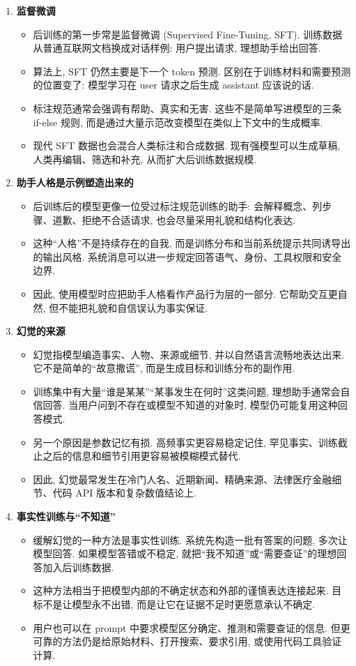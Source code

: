 \documentclass{../nndlcourse}
\begin{document}
\begin{enumerate}
  \item \textbf{监督微调}
    \begin{itemize}
      \item 后训练的第一步常是监督微调 (Supervised Fine-Tuning, SFT). 训练数据从普通互联网文档换成对话样例: 用户提出请求, 理想助手给出回答.
      \item 算法上, SFT 仍然主要是下一个 token 预测. 区别在于训练材料和需要预测的位置变了: 模型学习在 user 请求之后生成 assistant 应该说的话.
      \item 标注规范通常会强调有帮助、真实和无害. 这些不是简单写进模型的三条 if-else 规则, 而是通过大量示范改变模型在类似上下文中的生成概率.
      \item 现代 SFT 数据也会混合人类标注和合成数据. 现有强模型可以生成草稿, 人类再编辑、筛选和补充, 从而扩大后训练数据规模.
    \end{itemize}
  \item \textbf{助手人格是示例塑造出来的}
    \begin{itemize}
      \item 后训练后的模型更像一位受过标注规范训练的助手: 会解释概念、列步骤、道歉、拒绝不合适请求, 也会尽量采用礼貌和结构化表达.
      \item 这种“人格”不是持续存在的自我, 而是训练分布和当前系统提示共同诱导出的输出风格. 系统消息可以进一步规定回答语气、身份、工具权限和安全边界.
      \item 因此, 使用模型时应把助手人格看作产品行为层的一部分. 它帮助交互更自然, 但不能把礼貌和自信误认为事实保证.
    \end{itemize}
  \item \textbf{幻觉的来源}
    \begin{itemize}
      \item 幻觉指模型编造事实、人物、来源或细节, 并以自然语言流畅地表达出来. 它不是简单的“故意撒谎”, 而是生成目标和训练分布的副作用.
      \item 训练集中有大量“谁是某某”“某事发生在何时”这类问题, 理想助手通常会自信回答. 当用户问到不存在或模型不知道的对象时, 模型仍可能复用这种回答模式.
      \item 另一个原因是参数记忆有损. 高频事实更容易稳定记住, 罕见事实、训练截止之后的信息和细节引用更容易被模糊模式替代.
      \item 因此, 幻觉最常发生在冷门人名、近期新闻、精确来源、法律医疗金融细节、代码 API 版本和复杂数值结论上.
    \end{itemize}
  \item \textbf{事实性训练与“不知道”}
    \begin{itemize}
      \item 缓解幻觉的一种方法是事实性训练. 系统先构造一批有答案的问题, 多次让模型回答. 如果模型答错或不稳定, 就把“我不知道”或“需要查证”的理想回答加入后训练数据.
      \item 这种方法相当于把模型内部的不确定状态和外部的谨慎表达连接起来. 目标不是让模型永不出错, 而是让它在证据不足时更愿意承认不确定.
      \item 用户也可以在 prompt 中要求模型区分确定、推测和需要查证的信息. 但更可靠的方法仍是给原始材料、打开搜索、要求引用, 或使用代码工具验证计算.
    \end{itemize}
\end{enumerate}
\end{document}
